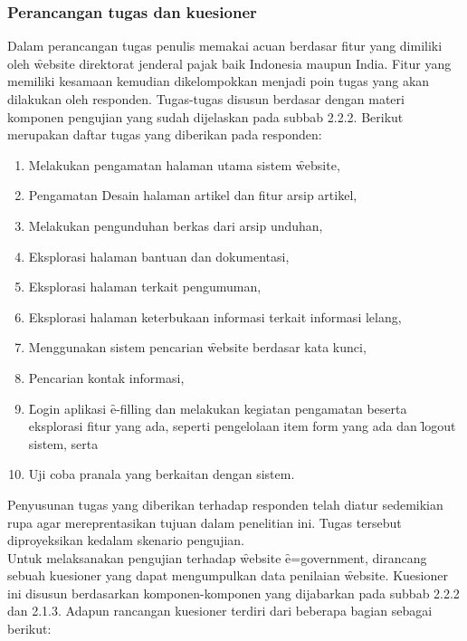 \subsubsection{Perancangan tugas dan kuesioner}
Dalam perancangan tugas penulis memakai acuan berdasar fitur yang dimiliki oleh \f{website} direktorat jenderal pajak baik Indonesia maupun India. Fitur yang memiliki kesamaan kemudian dikelompokkan menjadi poin tugas yang akan dilakukan oleh responden. Tugas-tugas disusun berdasar dengan materi komponen pengujian yang sudah dijelaskan pada subbab 2.2.2.
Berikut merupakan daftar tugas yang diberikan pada responden:
\begin{enumerate}
	\item Melakukan pengamatan halaman utama sistem \f{website},
	\item Pengamatan Desain halaman artikel dan fitur arsip artikel,
	\item Melakukan pengunduhan berkas dari arsip unduhan,
	\item Eksplorasi halaman bantuan dan dokumentasi,
	\item Eksplorasi halaman terkait pengumuman,
	\item Eksplorasi halaman keterbukaan informasi terkait informasi lelang,
	\item Menggunakan sistem pencarian \f{website} berdasar kata kunci,
	\item Pencarian kontak informasi,
	\item \f{Login} aplikasi \f{e-filling} dan melakukan kegiatan pengamatan beserta eksplorasi fitur yang ada, seperti pengelolaan item form yang ada dan \f{logout} sistem, serta
	\item Uji coba pranala yang berkaitan dengan sistem.
\end{enumerate}
Penyusunan tugas yang diberikan terhadap responden telah diatur sedemikian rupa agar mereprentasikan tujuan dalam penelitian ini. Tugas tersebut diproyeksikan kedalam skenario pengujian.
\newline\\
Untuk melaksanakan pengujian terhadap \f{website} \f{e=government}, dirancang sebuah kuesioner yang dapat mengumpulkan data penilaian \f{website}. Kuesioner ini disusun berdasarkan komponen-komponen yang dijabarkan pada subbab 2.2.2 dan 2.1.3. Adapun rancangan kuesioner \ust \space terdiri dari beberapa bagian sebagai berikut:
